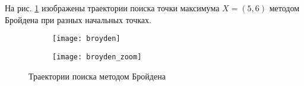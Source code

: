 На рис. \ref{fig:broyden} изображены траектории поиска точки максимума $X = (5, 6)$ методом Бройдена при разных начальных точках.
\begin{figure}[H]
\begin{center}
	\begin{subfigure}[b]{0.49\textwidth}
		\texttt{[image: broyden]}
	\end{subfigure}
	\begin{subfigure}[b]{0.49\textwidth}
		\texttt{[image: broyden\_zoom]}
	\end{subfigure}
	\caption{Траектории поиска методом Бройдена}
	\label{fig:broyden}
\end{center}
\end{figure}

